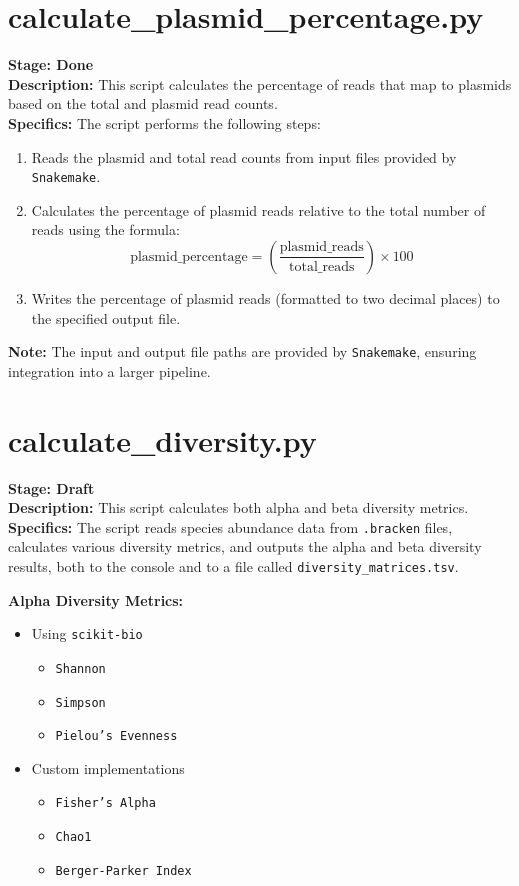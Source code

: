 \documentclass[11pt]{report}
\begin{document}
{\linenumbers*
\section{calculate\_plasmid\_percentage.py}
\textbf{Stage: Done} \\   
\textbf{Description:} This script calculates the percentage of reads that map to plasmids based on the total and plasmid read counts. \\
\textbf{Specifics:} The script performs the following steps:
\begin{enumerate}
	\item Reads the plasmid and total read counts from input files provided by \texttt{Snakemake}.
	\item Calculates the percentage of plasmid reads relative to the total number of reads using the formula: 
	\[ \text{plasmid\_percentage} = \left( \frac{\text{plasmid\_reads}}{\text{total\_reads}} \right) \times 100 \]
	\item Writes the percentage of plasmid reads (formatted to two decimal places) to the specified output file.
\end{enumerate}
\textbf{Note:} The input and output file paths are provided by \texttt{Snakemake}, ensuring integration into a larger pipeline. \\


\linenumbers*
\section{calculate\_diversity.py}
\textbf{Stage: Draft} \\   
\textbf{Description:} This script calculates both alpha and beta diversity metrics.\\
\textbf{Specifics:} The script reads species abundance data from \texttt{.bracken} files, calculates various diversity metrics, and outputs the alpha and beta diversity results, both to the console and to a file called \texttt{diversity\_matrices.tsv}.

\begin{multicols}{2}
	\textbf{Alpha Diversity Metrics:}
	\begin{itemize}
		\item Using \texttt{scikit-bio}
		\begin{itemize}
			\item \texttt{Shannon}
			\item \texttt{Simpson}
			\item \texttt{Pielou's Evenness}
		\end{itemize}
		\item Custom implementations
		\begin{itemize}
			\item \texttt{Fisher's Alpha}
			\item \texttt{Chao1}
			\item \texttt{Berger-Parker Index}
		\end{itemize}
	\end{itemize}
	

\end{multicols}}
\end{document}
